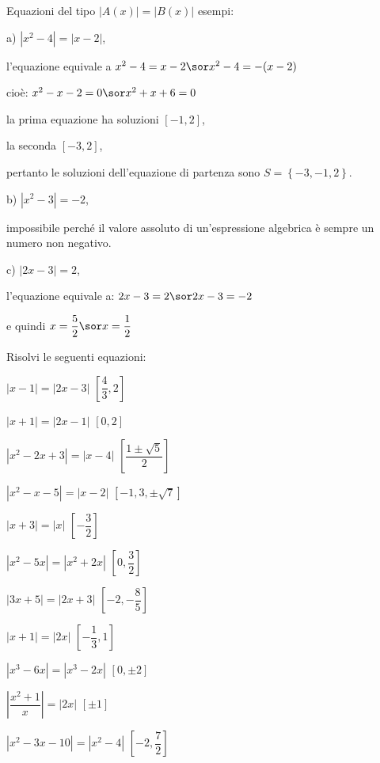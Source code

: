 \begin{esercizio}\label{ese:03.1}
Equazioni del tipo \(|A(x)|=|B(x)|\) esempi:
\begin{enumeratea}
\item[a)] \(|x^2-4|=|x-2|\), 

l'equazione equivale a \quad \(x^2-4=x-2 \sor x^2-4=-(x-2)\)

cioè: \quad \(x^2-x-2=0 \sor x^2+x+6=0\)

la prima equazione ha soluzioni \([-1, 2]\), 

la seconda \([-3, 2]\), 

pertanto le soluzioni dell'equazione di partenza sono 
\(S=\left\lbrace -3, -1, 2\right\rbrace \).

\item[b)] \(|x^2-3|=-2\), 

impossibile perché il valore assoluto di 
un'espressione algebrica è sempre un numero non negativo.
\item[c)] \(|2x-3|=2\), 

l'equazione equivale a: \quad \(2x-3=2 \sor 2x-3=-2\)

e quindi \quad \(x=\dfrac{5}{2} \sor x=\dfrac{1}{2}\)
\end{enumeratea}

\noindent Risolvi le seguenti equazioni:

\begin{multicols}{2}
\begin{enumeratea}
\item \(\left| x-1\right| =\left| 2x-3\right| \) \hfill \(\left[ \dfrac{4}{3}, 
2\right] \)
\item \(\left| x+1\right| =\left| 2x-1\right| \) \hfill \(\left[ 0, 2\right] \)
\item \(\left| x^2-2x+3 \right| =\left| x-4 \right| \) \hfill \(\left[ 
\dfrac{1\pm\sqrt{5}}{2}\right] \)
\item \(\left| x^2-x-5\right| =\left| x-2\right| \) \hfill \(\left[ -1, 3, \pm 
\sqrt{7}\right] \)
\item \(\left| x+3\right| =\left| x\right| \) \hfill \(\left[ -\dfrac{3}{2} 
\right] 
\)
\item \(\left| x^2-5x \right| =\left| x^2+2x \right| \) \hfill \(\left[ 0, 
\dfrac{3}{2} \right] \)
\item \(\left| 3x+5\right| =\left| 2x+3\right| \) \hfill \(\left[-2, 
-\dfrac{8}{5} 
\right] \)
\item \(\left| x+1\right| =\left| 2x\right| \) \hfill \(\left[ -\dfrac{1}{3}, 
1 
\right] \)
\item \(\left| x^3-6x\right| =\left| x^3-2x\right| \) \hfill \(\left[ 0, \pm 2 
\right] \)
\item \(\left|\dfrac{x^2+1}{x}\right| =\left| 2x\right| \) \hfill \(\left[ \pm 
1 
\right] \)
\item \(\left| x^2-3x-10\right| =\left| x^2-4\right| \) \hfill \(\left[-2, 
\dfrac{7}{2} \right] \)
\end{enumeratea}
\end{multicols}
\end{esercizio}

